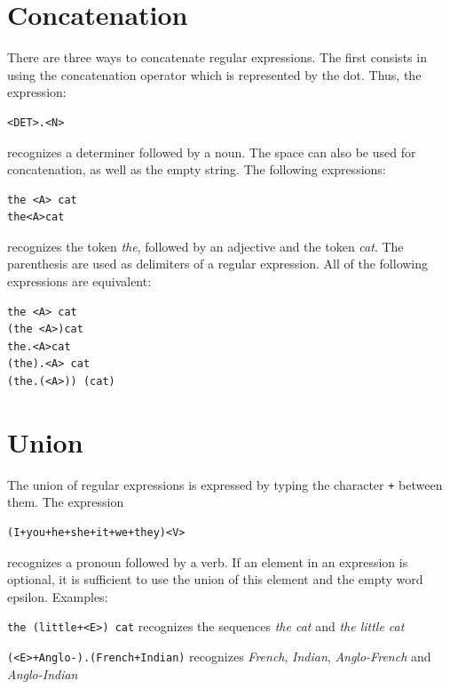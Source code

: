 \section{Concatenation}
There are three ways to concatenate regular expressions. The first consists in
using the concatenation operator which is represented by the dot.
Thus, the expression:

\begin{verbatim}
<DET>.<N>
\end{verbatim}

\noindent recognizes a determiner followed by a noun. The space can also be used for
concatenation, as well as the empty string. The following expressions:

\begin{verbatim}
the <A> cat
the<A>cat
\end{verbatim}

\noindent recognizes the token \textit{the}, followed by an adjective and the
token \textit{cat}. The parenthesis
 are used as delimiters of a regular expression.  All of the
following expressions are equivalent:

\begin{verbatim}
the <A> cat
(the <A>)cat
the.<A>cat
(the).<A> cat
(the.(<A>)) (cat)
\end{verbatim}

\section{Union}
\index{\verb$+$}
The union of regular expressions is expressed by typing the character \verb$+$
between them. The expression

\begin{verbatim}
(I+you+he+she+it+we+they)<V>
\end{verbatim}

\noindent
recognizes a pronoun followed by a verb. If an element in an
expression is optional, it is sufficient to use the union of this
element and the empty word epsilon.  Examples:

\bigskip
\noindent \verb$the (little+<E>) cat$ recognizes the sequences \textit{the cat}
and \textit{the little cat}

\smallskip
\noindent \verb$(<E>+Anglo-).(French+Indian)$ recognizes \textit{French}, \textit{Indian},
\textit{Anglo-French} and \textit{Anglo-Indian}

